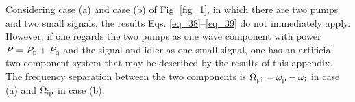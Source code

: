 \documentclass[10pt,letterpaper]{article}
\begin{document}
Considering case (a) and case (b) of Fig. \ref{fig_1}, in which there are two pumps and two small signals, the results Eqs. \eqref{eq_38}--\eqref{eq_39} do not immediately apply. However, if one regards the two pumps as one wave component with power $P = P_{\rm p} + P_{\rm q}$ and the signal and idler as one small signal, one has an artificial two-component system that may be described by the results of this appendix. The frequency separation between the two components is $\Omega_{\rm pi} = \omega_{\rm p} - \omega_{\rm i}$ in case (a) and $\Omega_{\rm ip}$ in case (b).
\end{document}
